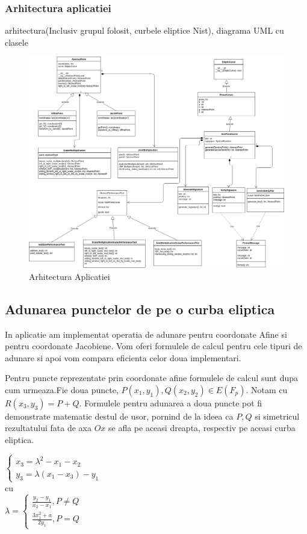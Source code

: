 \subsubsection{Arhitectura aplicatiei}
\label{sec:sec01}
arhitectura(Inclusiv grupul folosit, curbele eliptice Nist), diagrama UML cu clasele

\begin{figure}[htp]
\centering
\includegraphics[width=17.5cm]{chapters/Arhitectura.png}
\caption{Arhitectura Aplicatiei}
\label{fig:lion}
\end{figure}

\subsection{Adunarea punctelor de pe o curba eliptica}
\label{subsec:subsec02}
In aplicatie am implementat operatia de adunare pentru coordonate Afine si pentru coordonate Jacobiene. Vom oferi formulele de calcul pentru cele tipuri de adunare si apoi vom compara eficienta celor doua implementari.
\begin{dfn}
Pentru puncte reprezentate prin coordonate afine formulele de calcul sunt dupa cum urmeaza.Fie doua puncte, $P(x_{1}, y_1), Q(x_2, y_2)\in E(F_p)$. Notam cu $R(x_3, y_3) = P + Q$. Formulele pentru adunarea a doua puncte pot fi demonstrate matematic destul de usor, pornind de la ideea ca $P, Q$ si simetricul rezultatului fata de axa $Ox$ se afla pe aceasi dreapta, respectiv pe aceasi curba eliptica.

$\begin{cases} 
    x_3 = \lambda^2 - x_1 - x_2 \\
    y_3 =  \lambda (x_1-x_3) - y_1
   \end{cases}$
 \\cu 
 \\$
 \lambda = 
 \begin{cases}
 \frac{y_2 - y_1}{x_2 - x_1}, P \neq Q \\ 
 \frac{3x^{2}_1 + a}{2y_1}, P = Q
 \end{cases}$ \\
\end{dfn}

